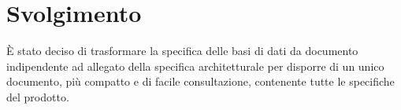 \section{Svolgimento}

È stato deciso di trasformare la specifica delle basi di dati da documento indipendente ad allegato della specifica architetturale per disporre di un unico documento, più compatto e di facile consultazione, contenente tutte le specifiche del prodotto.